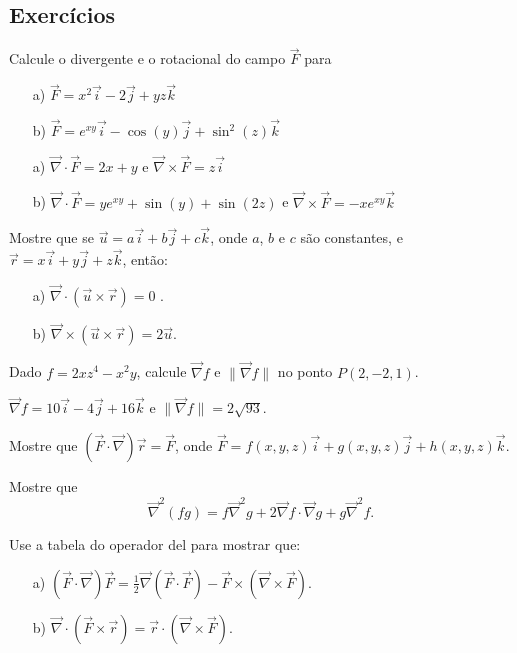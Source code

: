  \subsection*{Exercícios}
\begin{exer}
 Calcule o divergente e o rotacional do campo $\vec{F}$ para
 \begin{itemize}
  \item[a)] $\vec{F}=x^2\vec{i}-2\vec{j}+yz\vec{k}$
  \item[b)] $\vec{F}=e^{xy}\vec{i}-\cos(y)\vec{j}+\sin^2(z)\vec{k}$
 \end{itemize}
\end{exer}
\begin{resp}
 \begin{itemize}
  \item[a)] $\vec{\nabla}\cdot\vec{F}=2x+y$ e $\vec{\nabla}\times \vec{F}=z\vec{i}$
  \item[b)] $\vec{\nabla}\cdot\vec{F}=ye^{xy}+\sin(y)+\sin(2z)$ e $\vec{\nabla}\times \vec{F}=-xe^{xy}\vec{k}$
 \end{itemize}
\end{resp}

\begin{exer}
Mostre que se $\vec{u}=a\vec{i}+b\vec{j}+c\vec{k}$, onde $a$, $b$ e $c$ são constantes, e $\vec{r}=x\vec{i}+y\vec{j}+z\vec{k}$, então:
\begin{itemize}
 \item[a)] $\vec{\nabla}\cdot (\vec{u}\times \vec{r})=0$ .
 \item[b)] $\vec{\nabla}\times (\vec{u}\times \vec{r})=2\vec{u}$.
\end{itemize}
\end{exer}
\begin{exer} Dado $f=2xz^4-x^2y$, calcule $\vec{\nabla}f$ e $\|\vec{\nabla}f\|$ no ponto $P(2,-2,1)$.
\end{exer}
\begin{resp}
 $\vec{\nabla}f=10\vec{i}-4\vec{j}+16\vec{k}$ e $\|\vec{\nabla}f\|=2\sqrt{93}$.
\end{resp}
\begin{exer}
Mostre que $(\vec{F}\cdot\vec{\nabla})\vec{r}=\vec{F}$, onde $\vec{F}=f(x,y,z)\vec{i}+g(x,y,z)\vec{j}+h(x,y,z)\vec{k}$.
\end{exer}

\begin{exer}
 Mostre que
 $$
 \vec{\nabla}^2(fg)=f\vec{\nabla}^2g+2\vec{\nabla}f\cdot \vec{\nabla}g+g\vec{\nabla}^2f.
 $$
\end{exer}
\begin{exer}
 Use a  tabela do operador del para mostrar que:
 \begin{itemize}
  \item[a)] $(\vec{F}\cdot\vec{\nabla})\vec{F}=\frac{1}{2}\vec{\nabla}(\vec{F}\cdot\vec{F})-\vec{F}\times (\vec{\nabla}\times\vec{F})$.
  \item[b)] $\vec{\nabla}\cdot(\vec{F}\times\vec{r})=\vec{r}\cdot(\vec{\nabla}\times\vec{F})$.
 \end{itemize}
\end{exer}


